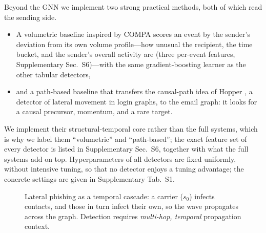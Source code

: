 \smallskip Beyond the GNN we implement two strong practical methods, both of which read the sending side.
\begin{itemize}[noitemsep,topsep=2pt]
  \item A volumetric baseline inspired by COMPA \citep{egele2013compa,stringhini2015thataint} scores an event
  by the sender's deviation from its own volume profile---how unusual the recipient, the time bucket, and the
  sender's overall activity are (three per-event features, Supplementary Sec.~S6)---with the same
  gradient-boosting learner as the other tabular detectors,
  \item and a path-based baseline that transfers the causal-path idea of Hopper \citep{ho2021hopper}, a
  detector of lateral movement in login graphs, to the email graph: it looks for a causal precursor,
  momentum, and a rare target.
\end{itemize}
We implement their structural-temporal core rather than the full systems, which is why we label them ``volumetric'' and
``path-based''; the exact feature set of every detector is listed in Supplementary Sec.~S6, together with what
the full systems add on top. Hyperparameters of all detectors are fixed uniformly, without intensive tuning,
so that no detector enjoys a tuning advantage; the concrete settings are given in Supplementary Tab.~S1.

\begin{figure}[pos=tbp]\centering
{}
\caption[Lateral phishing as a temporal cascade]{Lateral phishing as a temporal cascade: a carrier ($s_0$)
infects contacts, and those in turn infect their own, so the wave propagates across the graph. Detection requires \emph{multi-hop,
temporal} propagation context.}
\label{fig:cascade}
\end{figure}

